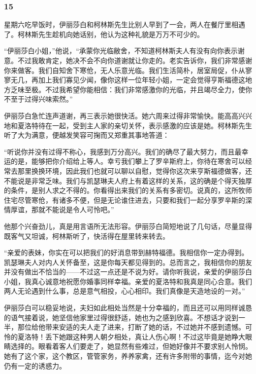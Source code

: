 \subsubsection*{15}


\par 星期六吃早饭时，伊丽莎白和柯林斯先生比别人早到了一会，两人在餐厅里相遇了。柯林斯先生趁机向她话别，他认为这种礼貌是万万不可少的。
\par “伊丽莎白小姐，”他说，“承蒙你光临敝舍，不知道柯林斯夫人有没有向你表示谢意。不过我敢肯定，她决不会不向你道谢就让你走的。老实告诉你，我们非常感谢你来做客。我们自知舍下寒伧，无人乐意光临。我们生活简朴，居室局促，仆从寥寥无几，再加上我们寡见少闻，像你这样一位年轻小姐，一定会觉得亨斯福德这地方乏味至极。不过我希望你能相信：我们非常感激你的光临，并且竭尽全力，使你不至于过得兴味索然。”
\par 伊丽莎白急忙连声道谢，再三表示她很快活。她六周来过得非常愉快。能高高兴兴地和夏洛特待在一起，受到主人家的亲切关怀，表示感激的应该是她。柯林斯先生听了大为满意，便越发笑容可掬而又郑重其事地答道：
\par “听说你并没有过得不称心，我感到万分高兴。我们的确尽了最大努力，而且最幸运的是，能够把你介绍给上等人。幸亏我们攀上了罗辛斯府上，你待在寒舍可以经常去那里换换环境，因此我们也就可以聊以自慰，觉得你这次来亨斯福德做客，还不能说是非常乏味。我们与凯瑟琳夫人府上有着这样的关系，这的确是个得天独厚的条件，是别人求之不得的。你看得出来我们的关系有多密切。说真的，这所牧师住宅尽管寒伧，有诸多不便，但是无论谁住进去，只要和我们一起分享罗辛斯的深情厚谊，那就不能说是令人可怜吧。”
\par 他那个兴奋劲儿，真是用言语所无法形容。伊丽莎白简短地说了几句话，尽量显得既客气又坦诚，柯林斯听了，快活得在屋里转来转去。
\par “亲爱的表妹，你实在可以把我们的好消息带到赫特福德。我相信你一定办得到。凯瑟琳夫人对内人关怀备至，这是你每天都见得到的。总而言之，我相信你的朋友并没有做出不恰当的——不过这一点还是不说为好。请你听我说，亲爱的伊丽莎白小姐，我真心诚意地祝愿你婚事同样幸福。亲爱的夏洛特和我真是同心合意。我们两人无论遇到什么事，总是意气相投，心心相印。我们真像是天造地设的一对。”
\par 伊丽莎白可以稳妥地说，夫妇如此相处当然是十分幸福的，而且还可以用同样诚恳的语气接着说，她坚信他家里过得很舒适，她也为之感到欣喜。不想话才说到一半，那位给他带来安适的夫人走了进来，打断了她的话，不过她并不感到遗憾。可怜的夏洛特！丢下她跟这种男人朝夕相处，真让人伤心啊！不过这毕竟是她睁大眼睛选择的。眼看着客人们要走了，她显然有些难过，但她好像并不要求别人怜悯。她有了这个家，这个教区，管管家务，养养家禽，还有许多附带的事情，迄今对她仍有一定的诱惑力。
